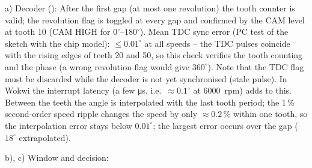 \begin{solution}
a) Decoder ():
After the first gap (at most one revolution) the tooth counter is valid; the
revolution flag is toggled at every gap and confirmed by the CAM level at tooth 10
(CAM HIGH for $0^\circ$--$180^\circ$). Mean TDC sync error (PC test of the sketch with the chip
model): $\le0.01^\circ$ at all speeds -- the TDC pulses coincide with the rising edges of
teeth 20 and 50, so this check verifies the tooth counting and the phase (a wrong
revolution flag would give $360^\circ$). Note that the TDC flag must be discarded while the
decoder is not yet synchronised (stale pulse). In Wokwi the interrupt latency (a few
\si{\micro s}, i.e.\ $\approx0.1^\circ$ at \SI{6000}{rpm}) adds to this. Between the teeth the
angle is interpolated with the last tooth period; the 1\,\% second-order speed ripple
changes the speed by only $\approx0.2\,\%$ within one tooth, so the interpolation error
stays below $0.01^\circ$; the largest error occurs over the gap ($18^\circ$ extrapolated).

b), c) Window and decision:


\end{solution}
